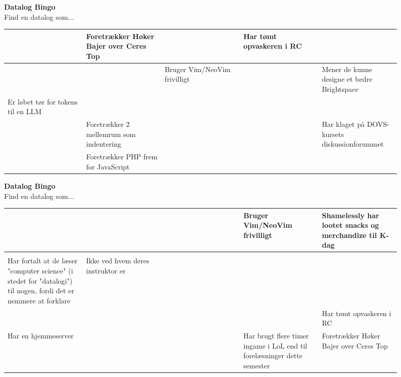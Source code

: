 \documentclass{article}
\begin{document}
\begin{center}
{\LARGE\bfseries Datalog Bingo}\\[0.5em]
{\large Find en datalog som...}\\[2em]
\begin{tabular}{|p{0.18\linewidth}|p{0.18\linewidth}|p{0.18\linewidth}|p{0.18\linewidth}|p{0.18\linewidth}|}
\hline
  & Foretrækker Høker Bajer over Ceres Top &   & Har tømt opvaskeren i RC &   \\
\hline
  &   & Bruger Vim/NeoVim frivilligt &   & Mener de kunne designe et bedre Brightspace \\
\hline
Er løbet tør for tokens til en LLM &   &   &   &   \\
\hline
  & Foretrækker 2 mellemrum som indentering &   &   & Har klaget på DOVS-kursets diskussionforummet \\
\hline
  & Foretrækker PHP frem for JavaScript &   &   &   \\
\hline
\end{tabular}
\end{center}
\newpage

\begin{center}
{\LARGE\bfseries Datalog Bingo}\\[0.5em]
{\large Find en datalog som...}\\[2em]
\begin{tabular}{|p{0.18\linewidth}|p{0.18\linewidth}|p{0.18\linewidth}|p{0.18\linewidth}|p{0.18\linewidth}|}
\hline
  &   &   & Bruger Vim/NeoVim frivilligt & Shamelessly har lootet snacks og merchandize til K-dag \\
\hline
  &   &   &   &   \\
\hline
Har fortalt at de læser "computer science" (i stedet for "datalogi") til nogen, fordi det er nemmere at forklare & Ikke ved hvem deres instruktor er &   &   &   \\
\hline
  &   &   &   & Har tømt opvaskeren i RC \\
\hline
Har en hjemmeserver &   &   & Har brugt flere timer ingame i LoL end til forelæsninger dette semester & Foretrækker Høker Bajer over Ceres Top \\
\hline
\end{tabular}
\end{center}
\newpage
\end{document}

